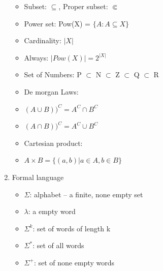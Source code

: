 \documentclass[11pt, a4paper]{article}
\begin{document}
\begin{multicols}{3}
\begin{enumerate}
\begin{itemize}
            \item Subset: $\subseteq$, Proper subset: $\Subset$
            \item Power set: Pow(X) = $\{A: A \subseteq X\}$
            \item Cardinality: $|X|$
            \item Always: $|Pow(X)| = 2^{|X|}$
            \item Set of Numbers: P $\subset$ N $\subset$ Z $\subset$ Q $\subset$ R
            \item De morgan Laws: 
            \item $(A \cup B))^C = A^C \cap B^C$
            \item $(A \cap B))^C = A^C \cup B^C$
            \item Cartesian product:
            \item $A \times B = \{(a,b) | a \in A, b \in B\}$
        \end{itemize}
    \item Formal language
        \begin{itemize}
            \item $\Sigma$: alphabet -- a finite, none empty set
            \item $\lambda$: a empty word
            \item $\Sigma^k$: set of words of length k
            \item $\Sigma^*$: set of all words
            \item $\Sigma^+$: set of none empty words
        \end{itemize}
    \end{enumerate}


\end{multicols}
\end{document}
